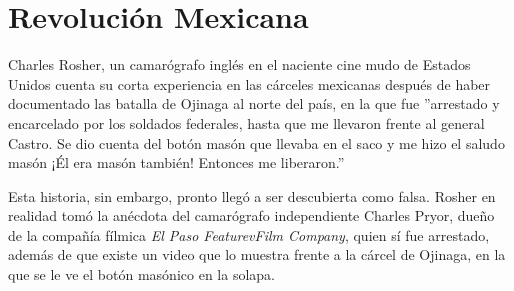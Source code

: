 \chapter{Revolución Mexicana}

Charles Rosher, un camarógrafo inglés en el naciente cine mudo de Estados Unidos cuenta su corta experiencia en las cárceles mexicanas después de haber documentado las batalla de Ojinaga al norte del país, en la que fue ''arrestado y encarcelado por los soldados federales, hasta que me llevaron frente al general Castro. Se dio cuenta del botón masón que llevaba en el saco y me hizo el saludo masón ¡Él era masón también! Entonces me liberaron.''\cite{rocha2003}

Esta historia, sin embargo, pronto llegó a ser descubierta como falsa. Rosher en realidad tomó la anécdota del camarógrafo independiente Charles Pryor, dueño de la compañía fílmica \emph{El Paso FeaturevFilm Company}\cite{worthington2010}, quien sí fue arrestado, además de que existe un video que lo muestra frente a la cárcel de Ojinaga, en la que se le ve el botón masónico en la solapa.


